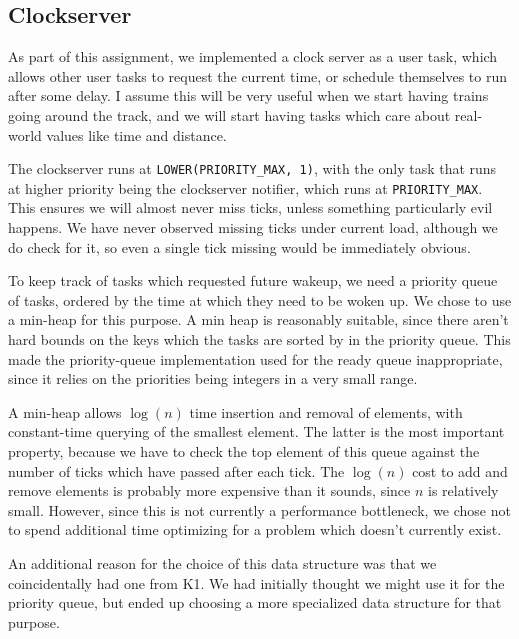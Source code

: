\documentclass[titlepage]{article}
\begin{document}
\subsection{Clockserver}
As part of this assignment, we implemented a clock server as a user task, which
allows other user tasks to request the current time, or schedule themselves to run
after some delay.
I assume this will be very useful
when we start having trains going around the track, and we will start having
tasks which care about real-world values like time and distance.

The clockserver runs at \texttt{LOWER(PRIORITY\_MAX, 1)}, with the only task
that runs at higher priority being the clockserver notifier, which runs at
\texttt{PRIORITY\_MAX}. This ensures we will almost never miss ticks, unless
something particularly evil happens. We have never observed missing ticks under
current load, although we do check for it, so even a single tick missing would
be immediately obvious.

To keep track of tasks which requested future wakeup, we need a priority queue
of tasks, ordered by the time at which they need to be woken up.
We chose to use a min-heap for this purpose.
A min heap is reasonably suitable, since there aren't hard bounds on
the keys which the tasks are sorted by in the priority queue.
This made the priority-queue implementation used for the ready queue inappropriate,
since it relies on the priorities being integers in a very small range.

A min-heap allows $\log(n)$ time insertion and removal of elements, with
constant-time querying of the smallest element.
The latter is the most important property, because we have to check the top
element of this queue against the number of ticks which have passed after each tick.
The $\log(n)$ cost to add and remove elements is probably more expensive than it
sounds, since $n$ is relatively small.
However, since this is not currently a performance bottleneck, we chose not to spend
additional time optimizing for a problem which doesn't currently exist.

An additional reason for the choice of this data structure was that we coincidentally
had one from K1.
We had initially thought we might use it for the priority queue,
but ended up choosing a more specialized data structure for that purpose.
\end{document}
